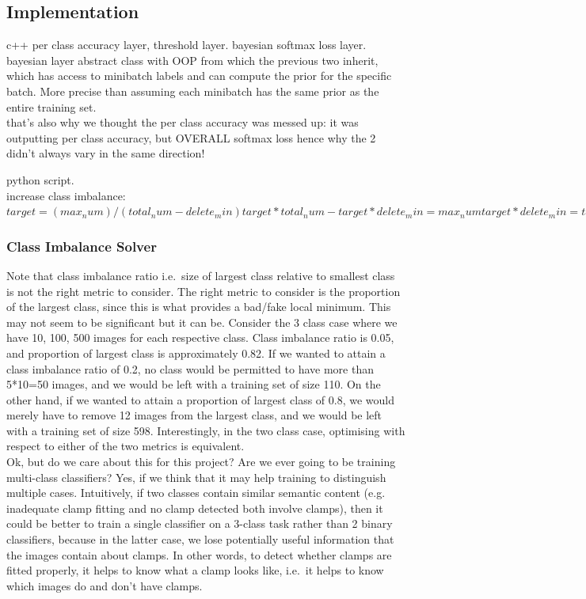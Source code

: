 \documentclass[a4paper,11pt]{article}
\begin{document}
\subsection{Implementation}

c++ per class accuracy layer, threshold layer. bayesian softmax loss layer. bayesian layer abstract class with OOP from which the previous two inherit, which has access to minibatch labels and can compute the prior for the specific batch. More precise than assuming each minibatch has the same prior as the entire training set. \\

that's also why we thought the per class accuracy was messed up: it was outputting per class accuracy, but OVERALL softmax loss
hence why the 2 didn't always vary in the same direction!

python script. \\

increase class imbalance:
$target = (max_num) / (total_num - delete_min)
target*total_num - target*delete_min = max_num
target*delete_min = target*total_num - max_num
delete_min = total_num - (max_num/target)$

\subsubsection{Class Imbalance Solver}

Note that class imbalance ratio i.e.\ size of largest class relative to smallest class is not the right metric to consider. The right metric to consider is the proportion of the largest class, since this is what provides a bad/fake local minimum. This may not seem to be significant but it can be. Consider the 3 class case where we have 10, 100, 500 images for each respective class. Class imbalance ratio is 0.05, and proportion of largest class is approximately 0.82. If we wanted to attain a class imbalance ratio of 0.2, no class would be permitted to have more than 5*10=50 images, and we would be left with a training set of size 110. On the other hand, if we wanted to attain a proportion of largest class of 0.8, we would merely have to remove 12 images from the largest class, and we would be left with a training set of size 598. Interestingly, in the two class case, optimising with respect to either of the two metrics is equivalent. \\

Ok, but do we care about this for this project? Are we ever going to be training multi-class classifiers? Yes, if we think that it may help training to distinguish multiple cases. Intuitively, if two classes contain similar semantic content (e.g. inadequate clamp fitting and no clamp detected both involve clamps), then it could be better to train a single classifier on a 3-class task rather than 2 binary classifiers, because in the latter case, we lose potentially useful information that the images contain about clamps. In other words, to detect whether clamps are fitted properly, it helps to know what a clamp looks like, i.e.\ it helps to know which images do and don't have clamps. \\
\end{document}
